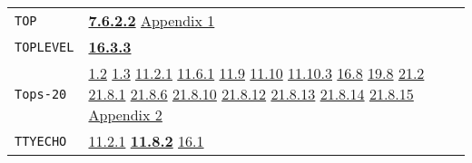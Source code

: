 \documentclass[a4paper]{scrbook}
\begin{document}
\begin{longtable}[]{@{}ll@{}}
\begin{minipage}[t]{0.24\columnwidth}\raggedright\strut
\texttt{TOP}\strut
\end{minipage} & \begin{minipage}[t]{0.70\columnwidth}\raggedright\strut
\textbf{\href{07-structured-objects.md\#7622-top-1}{7.6.2.2}}
\href{appendix-1-a-look-inside.md\#basic-data-structures}{Appendix 1}\strut
\end{minipage}\tabularnewline
\begin{minipage}[t]{0.24\columnwidth}\raggedright\strut
\texttt{TOPLEVEL}\strut
\end{minipage} & \begin{minipage}[t]{0.70\columnwidth}\raggedright\strut
\textbf{\href{16-errors-frames-etc.md\#1633-frame-the-subr}{16.3.3}}\strut
\end{minipage}\tabularnewline
\begin{minipage}[t]{0.24\columnwidth}\raggedright\strut
\texttt{Tops-20}\strut
\end{minipage} & \begin{minipage}[t]{0.70\columnwidth}\raggedright\strut
\href{01-basic-introduction.md\#12-typing-1}{1.2} \href{01-basic-introduction.md\#13-loading-a-file-1}{1.3}
\href{11-input-output.md\#1121-open}{11.2.1} \href{11-input-output.md\#1161-save}{11.6.1}
\href{11-input-output.md\#119-internal-channels}{11.9}
\href{11-input-output.md\#1110-the-net-device-the-arpa-network}{11.10} \href{11-input-output.md\#11103-nets}{11.10.3}
\href{16-errors-frames-etc.md\#168-control-s-s}{16.8} \href{19-compiled-programs.md\#198-rsubrs-in-files}{19.8}
\href{21-interrupts.md\#212-event}{21.2} \href{21-interrupts.md\#2181-char-received}{21.8.1}
\href{21-interrupts.md\#2186-clock}{21.8.6} \href{21-interrupts.md\#21810-sysdown}{21.8.10}
\href{21-interrupts.md\#21812-ipc}{21.8.12} \href{21-interrupts.md\#21813-inferior}{21.8.13}
\href{21-interrupts.md\#21814-runt-and-realt}{21.8.14} \href{21-interrupts.md\#21815-dangerous-interrupts}{21.8.15}
\href{appendix-2-predefined-subroutines.md\#appendix-2-predefined-subroutines}{Appendix 2}\strut
\end{minipage}\tabularnewline
\begin{minipage}[t]{0.24\columnwidth}\raggedright\strut
\texttt{TTYECHO}\strut
\end{minipage} & \begin{minipage}[t]{0.70\columnwidth}\raggedright\strut
\href{11-input-output.md\#1121-open}{11.2.1} \textbf{\href{11-input-output.md\#1182-ttyecho}{11.8.2}}
\href{16-errors-frames-etc.md\#161-listen}{16.1}\strut

\end{minipage}
\end{longtable}
\end{document}
